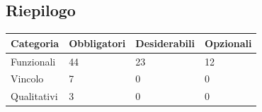 \documentclass[12pt,a4paper,titlepage]{article}
\begin{document}
	\subsection{Riepilogo}
	\begin{center}
		{\renewcommand\arraystretch{1.2}  %
			\small
			\begin{tabular}{|l|l|l|l|}
				\hline
				\textbf{Categoria} & \textbf{Obbligatori} & \textbf{Desiderabili} & \textbf{Opzionali}\\
				\hline
				Funzionali & 44 & 23 & 12 \\
				\hline
				Vincolo & 7 & 0 & 0\\
				\hline
				Qualitativi & 3 & 0 & 0\\
				\hline
			\end{tabular}
		}	
	\end{center}
\end{document}
